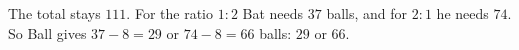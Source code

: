 The total stays $111$. For the ratio $1:2$ Bat needs $37$ balls, and for $2:1$ he needs $74$. So Ball gives $37-8=29$ or $74-8=66$ balls: $\boxed{29\text{ or }66}$.

